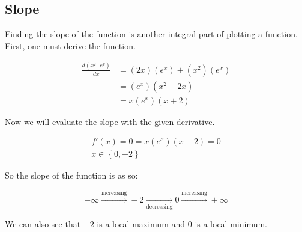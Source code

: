 \subsection{Slope}

Finding the slope of the function is another integral part of
plotting a function. First, one must derive the function.

\[
    \begin{aligned}
        \frac{d(x^2\cdot e^x)}{dx} &
          = (2x)(e^x) + (x^2)(e^x) \\
        & = (e^x)(x^2 + 2x) \\
        & = x(e^x)(x+2)
    \end{aligned}
\]

Now we will evaluate the slope with the given derivative.

\[
    \begin{split}
        f'(x) = 0 = x(e^x)(x+2) = 0 \\
        x \in \left\{0, -2\right\}
    \end{split}
\]

So the slope of the function is as so:

\[
    - \infty \xrightarrow{\text{increasing}} -2 \xrightarrow[\text{decreasing}]{} 0 \xrightarrow{\text{increasing}} +\infty
\]

We can also see that $-2$ is a local maximum and $0$ is a local minimum.